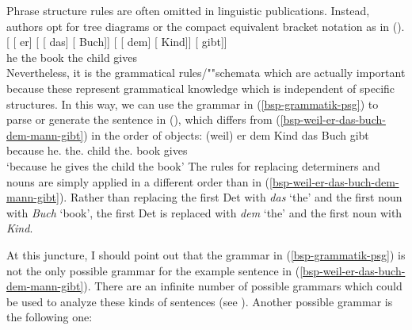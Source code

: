 Phrase structure rules are often omitted in linguistic publications. Instead, authors opt for tree diagrams or the compact equivalent bracket notation
as in ().
\ea
\gll {}[ [ er] [ [ das] [ Buch]]  [ [ dem] [ Kind]] [ gibt]]\\
     {}         {}        he  {}        {}       the  {}       book    {}        {}       the  {}       child     {}      gives\\  
\z
Nevertheless, it is the grammatical rules/""schemata which are actually important because these represent grammatical knowledge which is independent of specific structures.
In this way, we can use the grammar in (\ref{bsp-grammatik-psg}) to parse or generate the sentence
in (), which differs from (\ref{bsp-weil-er-das-buch-dem-mann-gibt}) in the order of objects: 
\ea
\gll {}(weil) er dem Kind das Buch gibt\\
     {}\spacebr{}because he.\NOM{} the.\DAT{} child the.\ACC{} book gives\\
\glt `because he gives the child the book'
\z
The rules for replacing determiners and nouns are simply applied in a different order than in (\ref{bsp-weil-er-das-buch-dem-mann-gibt}). Rather than replacing the first Det with \emph{das} `the' and the first noun with \emph{Buch} `book', the first Det is replaced with \emph{dem} `the' and the first noun with \emph{Kind}.

At this juncture, I should point out that the grammar in (\ref{bsp-grammatik-psg}) is not the only possible grammar for the example sentence in
(\ref{bsp-weil-er-das-buch-dem-mann-gibt}). There are an infinite\label{page-unendlich-viele-grammatiken} number of possible grammars which could
be used to analyze these kinds of sentences (see \citealt[Chapter~2,
Exercise~1]{MuellerGT-Eng}). Another possible grammar is the following one:

